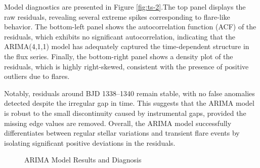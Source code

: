 \documentclass[
]{article}
\begin{document}
Model diagnostics are presented in Figure \ref{fig:ts-2}.The top panel displays the raw residuals, revealing several extreme spikes corresponding to flare-like behavior. The bottom-left panel shows the autocorrelation function (ACF) of the residuals, which exhibits no significant autocorrelation, indicating that the ARIMA(4,1,1) model has adequately captured the time-dependent structure in the flux series. Finally, the bottom-right panel shows a density plot of the residuals, which is highly right-skewed, consistent with the presence of positive outliers due to flares.

Notably, residuals around BJD 1338--1340 remain stable, with no false anomalies detected despite the irregular gap in time. This suggests that the ARIMA model is robust to the small discontinuity caused by instrumental gaps, provided the missing edge values are removed. Overall, the ARIMA model successfully differentiates between regular stellar variations and transient flare events by isolating significant positive deviations in the residuals.

\begin{figure}[H]

{\centering {}

}

\caption{ARIMA Model Results and Diagnosis}\label{fig:ts}
\end{figure}
\end{document}

